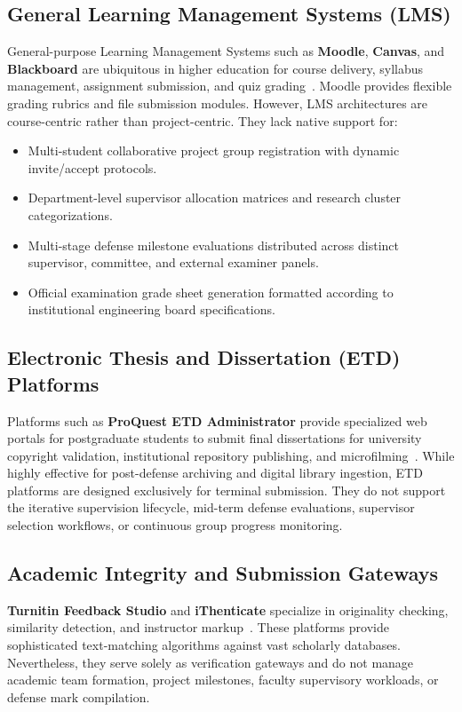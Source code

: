 \subsection{General Learning Management Systems (LMS)}
General-purpose Learning Management Systems such as \textbf{Moodle}, \textbf{Canvas}, and \textbf{Blackboard} are ubiquitous in higher education for course delivery, syllabus management, assignment submission, and quiz grading~\citep{ritzer2022moodle}. Moodle provides flexible grading rubrics and file submission modules. However, LMS architectures are course-centric rather than project-centric. They lack native support for:
\begin{itemize}
    \item Multi-student collaborative project group registration with dynamic invite/accept protocols.
    \item Department-level supervisor allocation matrices and research cluster categorizations.
    \item Multi-stage defense milestone evaluations distributed across distinct supervisor, committee, and external examiner panels.
    \item Official examination grade sheet generation formatted according to institutional engineering board specifications.
\end{itemize}

\subsection{Electronic Thesis and Dissertation (ETD) Platforms}
Platforms such as \textbf{ProQuest ETD Administrator} provide specialized web portals for postgraduate students to submit final dissertations for university copyright validation, institutional repository publishing, and microfilming~\citep{proquest2024etd}. While highly effective for post-defense archiving and digital library ingestion, ETD platforms are designed exclusively for terminal submission. They do not support the iterative supervision lifecycle, mid-term defense evaluations, supervisor selection workflows, or continuous group progress monitoring.

\subsection{Academic Integrity and Submission Gateways}
\textbf{Turnitin Feedback Studio} and \textbf{iThenticate} specialize in originality checking, similarity detection, and instructor markup~\citep{turnitin2024feedback}. These platforms provide sophisticated text-matching algorithms against vast scholarly databases. Nevertheless, they serve solely as verification gateways and do not manage academic team formation, project milestones, faculty supervisory workloads, or defense mark compilation.

